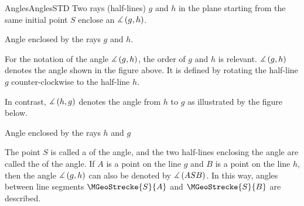 \begin{MXContent}{Angles}{Angles}{STD}
Two rays (half-lines) $g$ and $h$ in the plane starting from the same initial
point $S$ enclose an  $\measuredangle\left(g, h\right)$.

\begin{center}
\par
Angle enclosed by the rays $g$ and $h$.
\end{center}

For the notation of the angle $\measuredangle \left( g, h \right)$, 
the order of $g$ and $h$ is relevant. $\measuredangle \left( g, h \right)$
denotes the angle shown in the figure above. It is defined by
rotating the half-line $g$ counter-clockwise to the half-line $h$.

In contrast, $\measuredangle \left( h, g \right)$ denotes the angle from 
$h$ to $g$ as illustrated by the figure below.


\begin{center}
\par
Angle enclosed by the rays $h$ and $g$
\end{center}

The point $S$ is called a  of the angle, and 
the two half-lines enclosing the angle are called the  of the angle. 
If $A$ is a point on the line $g$ and $B$ is a point on the line $h$, then 
the angle $\measuredangle \left( g, h \right)$ can also be denoted by 
$\measuredangle \left( A S B \right)$. In this way, angles between line segments 
$\MGeoStrecke{S}{A}$ and $\MGeoStrecke{S}{B}$ are described.


\end{MXContent}
